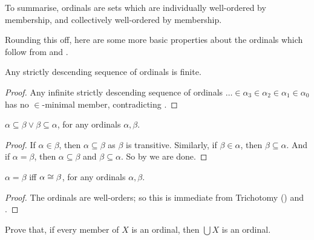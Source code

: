 \documentclass[../../../include/open-logic-section]{subfiles}
\begin{document}
To summarise, ordinals are sets which are individually well-ordered by
membership, and collectively well-ordered by membership. 

Rounding this off, here are some more basic properties about the
ordinals which follow from  and
. 

\begin{prop}
Any strictly descending sequence of ordinals is finite.
\end{prop}

\begin{proof}
Any infinite strictly descending sequence of ordinals $\ldots \in
\alpha_3 \in \alpha_2 \in \alpha_1 \in \alpha_0$ has no $\in$-minimal
member, contradicting .
\end{proof}

\begin{prop}
$\alpha \subseteq \beta \lor \beta \subseteq \alpha$, for any ordinals
$\alpha, \beta$.
\end{prop}

\begin{proof}
If $\alpha \in \beta$, then $\alpha \subseteq \beta$ as $\beta$ is
transitive. Similarly, if $\beta \in \alpha$, then $\beta \subseteq
\alpha$. And if $\alpha = \beta$, then $\alpha \subseteq \beta$ and
$\beta \subseteq \alpha$. So by    we are done.
\end{proof}

\begin{prop}
$\alpha = \beta$ iff $\alpha \cong \beta$, for any ordinals
$\alpha, \beta$.
\end{prop}

\begin{proof}
The ordinals are well-orders; so this is immediate from Trichotomy
() and
. 
\end{proof}

\begin{prob}
Prove that, if every member of $X$ is an ordinal, then $\bigcup X$ is an ordinal.
\end{prob}
\end{document}
